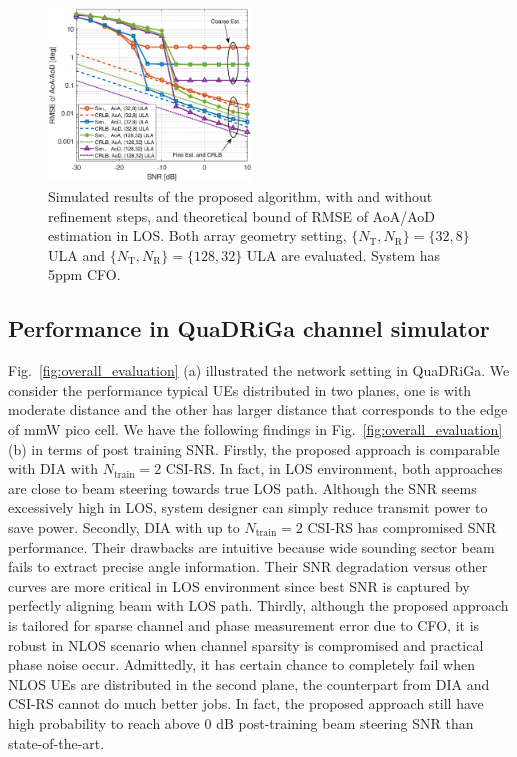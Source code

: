 \documentclass[journal]{IEEEtran}
\newcommand{\tx}[0]{\text{T}}
\newcommand{\rx}[0]{\text{R}}
\begin{document}
\begin{figure}
\begin{center}
\includegraphics[width=0.48\textwidth]{figures/BF_training_sim_CRLB_new}
\end{center}
\vspace{-4mm}
\caption{Simulated results of the proposed algorithm, with and without refinement steps, and theoretical bound of RMSE of AoA/AoD estimation in LOS. Both array geometry setting, $\{N_{\tx},N_{\rx}\} = \{32,8\}$ ULA and $\{N_{\tx},N_{\rx}\} = \{128,32\}$ ULA are evaluated. System has 5ppm CFO.}
\vspace{-4mm}
\label{fig:CRLB}
\end{figure}


% 
%
\subsection{Performance in QuaDRiGa channel simulator}
\label{sec:realistic_sim}

Fig.~\ref{fig:overall_evaluation} (a) illustrated the network setting in QuaDRiGa. We consider the performance typical UEs distributed in two planes, one is with moderate distance and the other has larger distance that corresponds to the edge of mmW pico cell. We have the following findings in Fig.~\ref{fig:overall_evaluation} (b) in terms of post training SNR. 
%
Firstly, the proposed approach is comparable with DIA with $N_{\text{train}} = 2$ CSI-RS. In fact, in LOS environment, both approaches are close to beam steering towards true LOS path. Although the SNR seems excessively high in LOS, system designer can simply reduce transmit power to save power.
%
Secondly, DIA with up to $N_{\text{train}} = 2$ CSI-RS has compromised SNR performance. Their drawbacks are intuitive because wide sounding sector beam fails to extract precise angle information. Their SNR degradation versus other curves are more critical in LOS environment since best SNR is captured by perfectly aligning beam with LOS path.
%
Thirdly, although the proposed approach is tailored for sparse channel and phase measurement error due to CFO, it is robust in NLOS scenario when channel sparsity is compromised and practical phase noise occur. Admittedly, it has certain chance to completely fail when NLOS UEs are distributed in the second plane, the counterpart from DIA and CSI-RS cannot do much better jobs. In fact, the proposed approach still have high probability to reach above $0$ dB post-training beam steering SNR than state-of-the-art.
\end{document}
